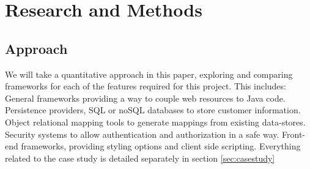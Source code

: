 \documentclass[12pt]{article}
\begin{document}
\section{Research and Methods}
\begin{multicols}{2}
\subsection{Approach}
We will take a quantitative approach in this paper, exploring and comparing frameworks for each of the features required for this project. This includes: General frameworks providing a way to couple web resources to Java code. Persistence providers, SQL or noSQL databases to store customer information. Object relational mapping tools to generate mappings from existing data-stores. Security systems to allow authentication and authorization in a safe way. Front-end frameworks, providing styling options and client side scripting. Everything related to the case study is detailed separately in section \ref{sec:casestudy}

\end{multicols}
\end{document}
